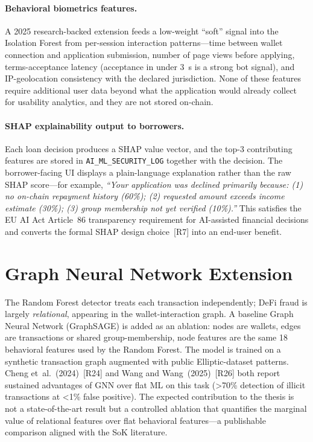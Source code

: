 \documentclass[12pt,a4paper]{report}
\begin{document}
\paragraph{Behavioral biometrics features.}
A 2025 research-backed extension feeds a low-weight ``soft'' signal into the Isolation Forest from per-session interaction patterns---time between wallet connection and application submission, number of page views before applying, terms-acceptance latency (acceptance in under 3~s is a strong bot signal), and IP-geolocation consistency with the declared jurisdiction. None of these features require additional user data beyond what the application would already collect for usability analytics, and they are not stored on-chain.

\paragraph{SHAP explainability output to borrowers.}
Each loan decision produces a SHAP value vector, and the top-3 contributing features are stored in \texttt{AI\_ML\_SECURITY\_LOG} together with the decision. The borrower-facing UI displays a plain-language explanation rather than the raw SHAP score---for example, \emph{``Your application was declined primarily because: (1) no on-chain repayment history (60\%); (2) requested amount exceeds income estimate (30\%); (3) group membership not yet verified (10\%).''} This satisfies the EU AI Act Article~86 transparency requirement for AI-assisted financial decisions and converts the formal SHAP design choice~[R7] into an end-user benefit.

\section{Graph Neural Network Extension}
\label{sec:gnn-extension}

The Random Forest detector treats each transaction independently; DeFi fraud is largely \emph{relational}, appearing in the wallet-interaction graph. A baseline Graph Neural Network (GraphSAGE) is added as an ablation: nodes are wallets, edges are transactions or shared group-membership, node features are the same 18 behavioral features used by the Random Forest. The model is trained on a synthetic transaction graph augmented with public Elliptic-dataset patterns. Cheng et~al.~(2024)~[R24] and Wang and Wang~(2025)~[R26] both report sustained advantages of GNN over flat ML on this task (>70\% detection of illicit transactions at <1\% false positive). The expected contribution to the thesis is not a state-of-the-art result but a controlled ablation that quantifies the marginal value of relational features over flat behavioral features---a publishable comparison aligned with the SoK literature.
\end{document}
